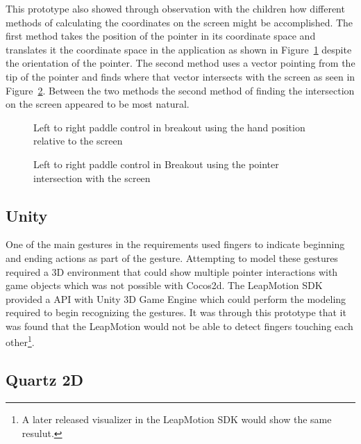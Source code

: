 This prototype also showed through observation with the children how different methods of calculating the coordinates on the screen might be accomplished. The first method takes the position of the pointer in its coordinate space and translates it the coordinate space in the application as shown in Figure~\ref{fig:HandPosition} despite the orientation of the pointer. The second method uses a vector pointing from the tip of the pointer and finds where that vector intersects with the screen as seen in Figure~\ref{fig:PointerIntersect}. Between the two methods the second method of finding the intersection on the screen appeared to be most natural. 

\begin{figure}
\centering     %
{}
\caption{Left to right paddle control in breakout using the hand position relative to the screen }
\label{fig:HandPosition}
\end{figure}

\begin{figure}
\centering     %
{}
\caption{Left to right paddle control in Breakout using the pointer intersection with the screen }
\label{fig:PointerIntersect}
\end{figure}

\subsection{Unity}\label{unity_prototype}
One of the main gestures in the requirements used fingers to indicate beginning and ending actions as part of the gesture. Attempting to model these gestures required a 3D environment that could show multiple pointer interactions with game objects which was not possible with Cocos2d. The LeapMotion SDK provided a API with Unity 3D Game Engine which could perform the modeling required to begin recognizing the gestures. It was through this prototype that it was found that the LeapMotion would not be able to detect fingers touching each other\footnote{A later released visualizer in the LeapMotion SDK would show the same resulut.}. \cite{unity}

\subsection{Quartz 2D}\label{quartz2d_prototype}

